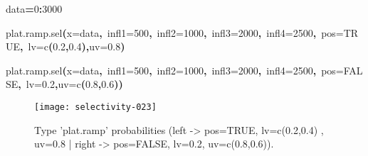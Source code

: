 \documentclass[letterpaper, 12pt]{article}
\newenvironment{Hinput}%
{}%
{}%
\newenvironment{Hchunk}%
{\vspace{0.5em}\par\begin{flushleft}}%
{\end{flushleft}}%
\newcommand{\hlnumber}[1]{\textcolor[rgb]{0.0823529411764706,0.0784313725490196,0.709803921568627}{#1}}%
\newcommand{\hlfunctioncall}[1]{\textcolor[rgb]{1,0,0}{#1}}%
\newcommand{\hlkeyword}[1]{\textcolor[rgb]{0,0,0}{\textbf{#1}}}%
\newcommand{\hlargument}[1]{\textcolor[rgb]{0.694117647058824,0.247058823529412,0.0196078431372549}{#1}}%
\newcommand{\hlassignement}[1]{\textcolor[rgb]{0.215686274509804,0.215686274509804,0.384313725490196}{\textbf{#1}}}%
\newcommand{\hlsymbol}[1]{\textcolor[rgb]{0,0,0}{#1}}%
\newcommand{\hlprompt}[1]{\textcolor[rgb]{0,0,0}{#1}}%
\begin{document}
\begin{Hchunk}
\begin{normalsize}
\begin{Hinput}
\ttfamily\noindent
\hlprompt{\usebox{\hlnormalsizeboxgreaterthan}{\ }}\hlsymbol{data}\hlassignement{=}\hlnumber{0}\hlkeyword{:}\hlnumber{3000}\mbox{}
\normalfont
\end{Hinput}


\begin{Hinput}
\ttfamily\noindent
\hlprompt{\usebox{\hlnormalsizeboxgreaterthan}{\ }}\hlfunctioncall{plat.ramp.sel}\hlkeyword{(}\hlargument{x}\hlargument{=}\hlsymbol{data}\hlkeyword{,}{\ }\hlargument{infl1}\hlargument{=}\hlnumber{500}\hlkeyword{,}{\ }\hlargument{infl2}\hlargument{=}\hlnumber{1000}\hlkeyword{,}{\ }\hlargument{infl3}\hlargument{=}\hlnumber{2000}\hlkeyword{,}{\ }\hlargument{infl4}\hlargument{=}\hlnumber{2500}\hlkeyword{,}{\ }\hlargument{pos}\hlargument{=}\hlnumber{TRUE}\hlkeyword{,}{\ }\hlargument{lv}\hlargument{=}\hlfunctioncall{c}\hlkeyword{(}\hlnumber{0.2}\hlkeyword{,}\hlnumber{0.4}\hlkeyword{)}\hlkeyword{,}\hlargument{uv}\hlargument{=}\hlnumber{0.8}\hlkeyword{)}\mbox{}
\normalfont
\end{Hinput}


\begin{Hinput}
\ttfamily\noindent
\hlprompt{\usebox{\hlnormalsizeboxgreaterthan}{\ }}\hlfunctioncall{plat.ramp.sel}\hlkeyword{(}\hlargument{x}\hlargument{=}\hlsymbol{data}\hlkeyword{,}{\ }\hlargument{infl1}\hlargument{=}\hlnumber{500}\hlkeyword{,}{\ }\hlargument{infl2}\hlargument{=}\hlnumber{1000}\hlkeyword{,}{\ }\hlargument{infl3}\hlargument{=}\hlnumber{2000}\hlkeyword{,}{\ }\hlargument{infl4}\hlargument{=}\hlnumber{2500}\hlkeyword{,}{\ }\hlargument{pos}\hlargument{=}\hlnumber{FALSE}\hlkeyword{,}{\ }\hlargument{lv}\hlargument{=}\hlnumber{0.2}\hlkeyword{,}\hlargument{uv}\hlargument{=}\hlfunctioncall{c}\hlkeyword{(}\hlnumber{0.8}\hlkeyword{,}\hlnumber{0.6}\hlkeyword{)}\hlkeyword{)}\mbox{}
\normalfont
\end{Hinput}


\end{normalsize}
\end{Hchunk}

\begin{figure}[h]
\vspace{-20pt}
\begin{center}
\texttt{[image: selectivity-023]}
\end{center}
\vspace{-30pt}
\caption{Type 'plat.ramp' probabilities (left -> pos=TRUE, lv=c(0.2,0.4) , uv=0.8 | right -> pos=FALSE, lv=0.2, uv=c(0.8,0.6)).}
\vspace{-10pt}
\label{fig11}
\end{figure}
\end{document}
